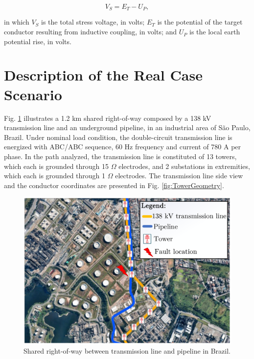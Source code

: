 \documentclass{IEEEtran4PSCC}
\begin{document}
\begin{equation} \label{eq:Vs}
	V_{S} = E_{T} - U_{P},
\end{equation}  

\noindent in which $V_{S}$ is the total stress voltage, in volts; $E_{T}$ is the potential of the target conductor resulting from inductive coupling, in volts; and $U_{P}$ is the local earth potential rise, in volts.

\section{Description of the Real Case Scenario}\label{sec:ScenarioDescription}

Fig. \ref{fig:Right-of-Way} illustrates a 1.2 km shared right-of-way composed by a 138 kV transmission line and an underground pipeline, in an industrial area of São Paulo, Brazil. Under nominal load condition, the double-circuit transmission line is energized with ABC/ABC sequence, 60 Hz frequency and current of 780 A per phase. In the path analyzed, the transmission line is constituted of 13 towers, which each is grounded through 15 $\Omega$ electrodes, and 2 substations in extremities, which each is grounded through 1 $\Omega$ electrodes. The transmission line side view and the conductor coordinates are presented in Fig. \ref{fig:TowerGeometry}.

\begin{figure}[hbt]
	\begin{center}
		\includegraphics[width=1\columnwidth]{./fig/right-of-way.pdf}
		\caption{Shared right-of-way between transmission line and pipeline in Brazil.}
		\label{fig:Right-of-Way}
	\end{center}
\end{figure}
\end{document}
